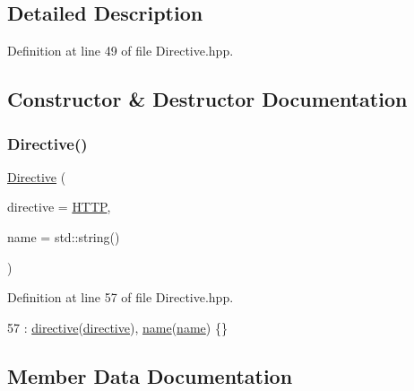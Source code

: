 \subsection{Detailed Description}


Definition at line 49 of file Directive.\+hpp.



\subsection{Constructor \& Destructor Documentation}
\mbox{\label{classft_1_1_directive_aedcc052461811957b6a8610e0c72968d}} 
\subsubsection{\texorpdfstring{Directive()}{Directive()}}
{\footnotesize\ttfamily \hyperlink{classft_1_1_directive}{Directive} (\begin{DoxyParamCaption}\item[{enum \hyperlink{namespaceft_a5a5554dff10f0dc50bae4cc5825ad75d}{Directive\+Kind}}]{directive = {\ttfamily \hyperlink{namespaceft_a5a5554dff10f0dc50bae4cc5825ad75da67e044074f46e6cea22788527da5f02e}{H\+T\+TP}},  }\item[{const std\+::string \&}]{name = {\ttfamily std\+:\+:string()} }\end{DoxyParamCaption})\hspace{0.3cm}{\ttfamily [inline]}}



Definition at line 57 of file Directive.\+hpp.


\begin{DoxyCode}
57 : \hyperlink{classft_1_1_directive_ad974f853279afa5ad30a28773b94fe87}{directive}(\hyperlink{classft_1_1_directive_ad974f853279afa5ad30a28773b94fe87}{directive}), \hyperlink{classft_1_1_directive_a9b45b3e13bd9167aab02e17e08916231}{name}(\hyperlink{classft_1_1_directive_a9b45b3e13bd9167aab02e17e08916231}{name}) \{\}
\end{DoxyCode}


\subsection{Member Data Documentation}
\mbox{\label{classft_1_1_directive_ad974f853279afa5ad30a28773b94fe87}} 
